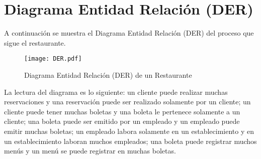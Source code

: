 	\chapter{Diagrama Entidad Relación (DER)}\label{Chap: DER}
	A continuación se muestra el Diagrama Entidad Relación (DER) del proceso que sigue el restaurante.

	\begin{figure}[h!]
		\centering
		\texttt{[image: DER.pdf]}
		\caption{Diagrama Entidad Relación (DER) de un Restaurante}
		\label{fig: DER Restaurante}
	\end{figure}
	
   La lectura del diagrama es lo siguiente: un cliente puede realizar muchas reservaciones y una reservación puede ser realizado solamente por un cliente; un cliente puede tener muchas boletas y una boleta le pertenece solamente a un cliente; una boleta puede ser emitido por un empleado y un empleado puede emitir muchas boletas; un empleado labora solamente en un establecimiento y en un establecimiento laboran muchos empleados; una boleta puede registrar muchos menús y un menú se puede registrar en muchas boletas.
	
	
	
	
	